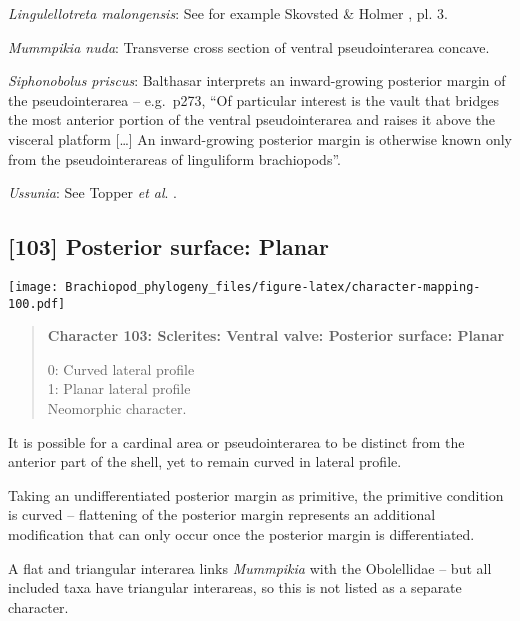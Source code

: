 \documentclass[openany]{book}
\theoremstyle{definition}
\theoremstyle{definition}
\theoremstyle{definition}
\theoremstyle{remark}
\begin{document}
\hypertarget{Lingulellotreta_malongensis-coding-102}{}
\emph{Lingulellotreta malongensis}: See for example Skovsted \& Holmer
\citeyearpar{Skovsted2005EarlyCambrian}, pl. 3.

\hypertarget{Mummpikia_nuda-coding-102}{}
\emph{Mummpikia nuda}: Transverse cross section of ventral
pseudointerarea concave.

\hypertarget{Siphonobolus_priscus-coding-102}{}
\emph{Siphonobolus priscus}: Balthasar
\citeyearpar{Balthasar2008iMummpikia} interprets an inward-growing
posterior margin of the pseudointerarea -- e.g.~p273, ``Of particular
interest is the vault that bridges the most anterior portion of the
ventral pseudointerarea and raises it above the visceral platform
{[}\ldots{}{]} An inward-growing posterior margin is otherwise known
only from the pseudointerareas of linguliform brachiopods''.

\hypertarget{Ussunia-coding-102}{}
\emph{Ussunia}: See Topper \emph{et al}.
\citeyearpar{Topper2013Reappraisalof}.

\subsection*{{[}103{]} Posterior surface:
Planar}\label{posterior-surface-planar}

\texttt{[image: Brachiopod\_phylogeny\_files/figure-latex/character-mapping-100.pdf]}

\begin{quote}
\textbf{Character 103: Sclerites: Ventral valve: Posterior surface:
Planar}

0: Curved lateral profile\\
1: Planar lateral profile\\
Neomorphic character.
\end{quote}

It is possible for a cardinal area or pseudointerarea to be distinct
from the anterior part of the shell, yet to remain curved in lateral
profile.

Taking an undifferentiated posterior margin as primitive, the primitive
condition is curved -- flattening of the posterior margin represents an
additional modification that can only occur once the posterior margin is
differentiated.

A flat and triangular interarea links \emph{Mummpikia} with the
Obolellidae \citep{Balthasar2008iMummpikia} -- but all included taxa
have triangular interareas, so this is not listed as a separate
character.
\end{document}
